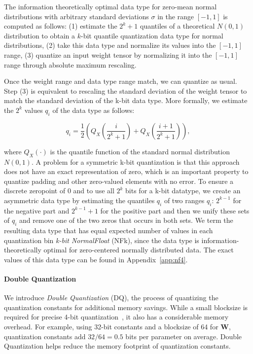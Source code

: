 The information theoretically optimal data type for zero-mean normal distributions with arbitrary standard deviations $\sigma$ in the range $[-1, 1]$ is computed as follows: (1) estimate the $2^k+1$ quantiles of a theoretical $N(0, 1)$ distribution to obtain a $k$-bit quantile quantization data type for normal distributions, (2) take this data type and normalize its values into the $[-1, 1]$ range, (3) quantize an input weight tensor by normalizing it into the $[-1, 1]$ range through absolute maximum rescaling. 

Once the weight range and data type range match, we can quantize as usual. Step (3) is equivalent to rescaling the standard deviation of the weight tensor to match the standard deviation of the k-bit data type. More formally, we estimate the $2^k$ values $q_i$ of the data type as follows:

\begin{equation}
q_i  = \frac{1}{2}\left( Q_X\left(\frac{i}{2^k+1}\right) + Q_X\left(\frac{i+1}{2^k+1}\right)\right),
\end{equation}

where $Q_X(\cdot)$ is the quantile function of the standard normal distribution $N(0,1)$. A problem for a symmetric k-bit quantization is that this approach does not have an exact representation of zero, which is an important property to quantize padding and other zero-valued elements with no error. To ensure a discrete zeropoint of $0$ and to use all $2^k$ bits for a k-bit datatype, we create an asymmetric data type by estimating the quantiles $q_i$ of two ranges $q_i$: $2^{k-1}$ for the negative part and $2^{k-1}+1$ for the positive part and then we unify these sets of $q_i$ and remove one of the two zeros that occurs in both sets. We term the resulting data type that has equal expected number of values in each quantization bin \emph{k-bit NormalFloat} (NFk), since the data type is information-theoretically optimal for zero-centered normally distributed data. The exact values of this data type can be found in Appendix~\ref{app:nf4}.

\paragraph{Double Quantization{}} 
We introduce \emph{Double Quantization} (DQ), the process of quantizing the quantization constants for additional memory savings. While a small blocksize is required for precise 4-bit quantization~\citep{dettmers2022case}, it also has a considerable memory overhead. For example, using 32-bit constants and a blocksize of 64 for $\mathbf{W}$, quantization constants add $32/64 = 0.5$ bits per parameter on average. Double Quantization helps reduce the memory footprint of quantization constants.

